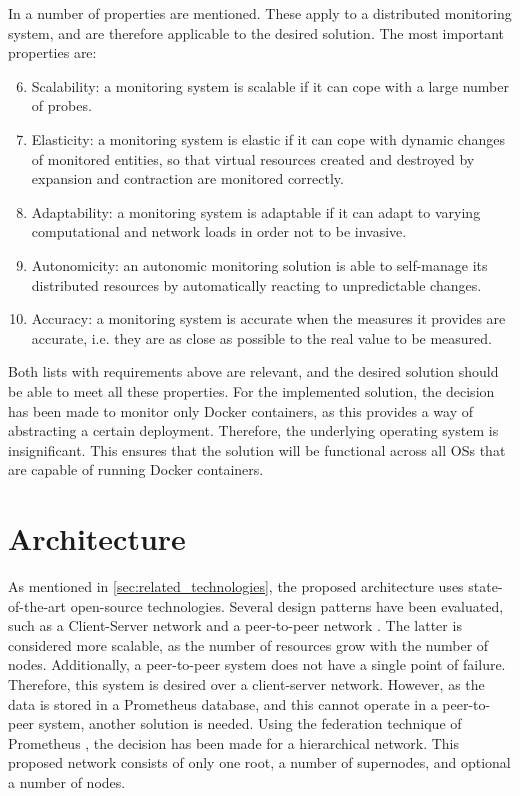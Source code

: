 \noindent
In \cite{aceto2013cloud} a number of properties are mentioned. These apply to a distributed monitoring system, and are therefore applicable to the desired solution. The most important properties are:
\begin{enumerate}
    \setcounter{enumi}{5}
    \item Scalability: a monitoring system is scalable if it can cope with a large number of probes.
    \item Elasticity: a monitoring system is elastic if it can cope with dynamic changes of monitored entities, so that virtual resources created and destroyed by expansion and contraction are monitored correctly.
    \item Adaptability: a monitoring system is adaptable if it can adapt to varying computational and network loads in order not to be invasive.
    \item Autonomicity: an autonomic monitoring solution is able to self-manage its distributed resources by automatically reacting to unpredictable changes.
    \item Accuracy: a monitoring system is accurate when the measures it provides are accurate, i.e. they are as close as possible to the real value to be measured.
\end{enumerate}

\noindent
Both lists with requirements above are relevant, and the desired solution should be able to meet all these properties. For the implemented solution, the decision has been made to monitor only Docker containers, as this provides a way of abstracting a certain deployment. Therefore, the underlying operating system is insignificant. This ensures that the solution will be functional across all OSs that are capable of running Docker containers. 

\section{Architecture} \label{sec:architecture}
As mentioned in \autoref{sec:related_technologies}, the proposed architecture uses state-of-the-art open-source technologies. Several design patterns have been evaluated, such as a Client-Server network and a peer-to-peer network \cite{coulouris2005distributed}. The latter is considered more scalable, as the number of resources grow with the number of nodes. Additionally, a peer-to-peer system does not have a single point of failure. Therefore, this system is desired over a client-server network. However, as the data is stored in a Prometheus database, and this cannot operate in a peer-to-peer system, another solution is needed. Using the federation technique of Prometheus \cite{prometheus_federation}, the decision has been made for a hierarchical network. This proposed network consists of only one root, a number of supernodes, and optional a number of nodes.\\

